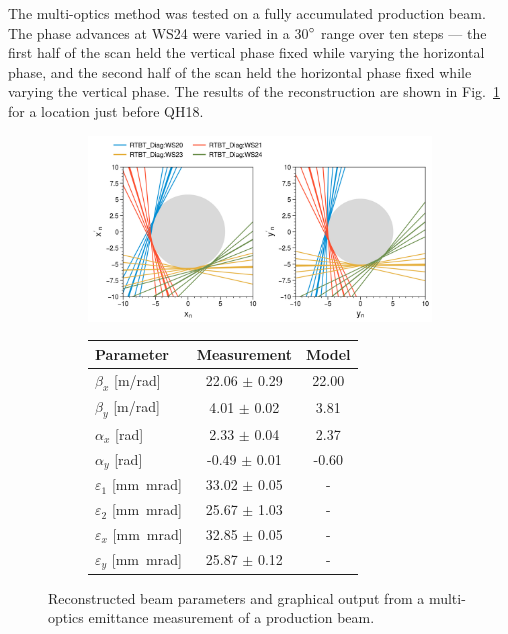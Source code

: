 The multi-optics method was tested on a fully accumulated production beam. The phase advances at WS24 were varied in a 30$\degree$ range over ten steps — the first half of the scan held the vertical phase fixed while varying the horizontal phase, and the second half of the scan held the horizontal phase fixed while varying the vertical phase. The results of the reconstruction are shown in Fig.~\ref{fig:prod_meas} for a location just before QH18.
%
\begin{figure}[!p]
    \centering
    \begin{subfigure}{0.8\textwidth}
        \centering
        \includegraphics[width=\textwidth]{Images/chapter4/prod_meas_lines.png}  
    \end{subfigure}
    \par\medskip
    \begin{subfigure}{0.6\textwidth}
        \centering
        \begin{tabular}{lcc}
            \small\textbf{Parameter} & \small\textbf{Measurement} & \small\textbf{Model} \\
            \midrule
            \small$\beta_x$ [m/rad] & \small22.06 $\pm$ 0.29 & \small22.00 \\
            \small$\beta_y$ [m/rad] & \small4.01 $\pm$ 0.02 & \small3.81 \\
            \small$\alpha_x$ [rad] & \small2.33 $\pm$ 0.04 & \small2.37 \\
            \small$\alpha_y$ [rad] & \small-0.49 $\pm$ 0.01 & \small-0.60 \\
            \small$\varepsilon_1$ [mm~mrad] & \small33.02 $\pm$ \small0.05 & - \\
            \small$\varepsilon_2$ [mm~mrad] & \small25.67 $\pm$ \small1.03 & - \\
            \small$\varepsilon_x$ [mm~mrad] & \small32.85 $\pm$ \small0.05 & - \\
            \small$\varepsilon_y$ [mm~mrad] & \small25.87 $\pm$ \small0.12 & - \\
          \end{tabular}
    \end{subfigure}
    \par\medskip
    \caption{Reconstructed beam parameters and graphical output from a multi-optics emittance measurement of a production beam.}
    \label{fig:prod_meas}
\end{figure}
